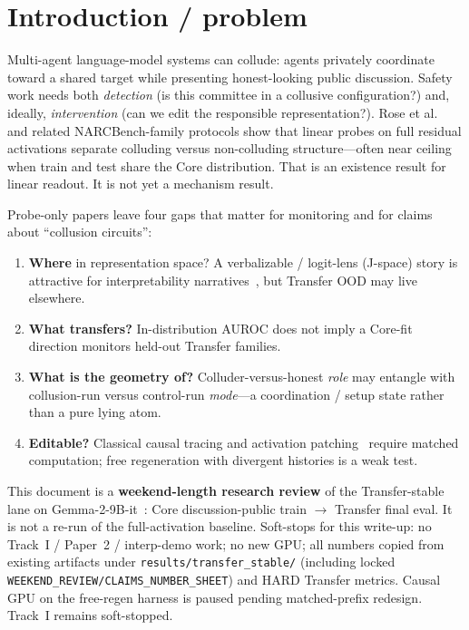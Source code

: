 \documentclass[11pt,a4paper]{article}
\begin{document}
\section{Introduction / problem}
\label{sec:intro}

Multi-agent language-model systems can collude: agents privately coordinate toward a shared target while presenting honest-looking public discussion. Safety work needs both \emph{detection} (is this committee in a collusive configuration?) and, ideally, \emph{intervention} (can we edit the responsible representation?). Rose et al.~\cite{rose2026narcbench} and related NARCBench-family protocols show that linear probes on full residual activations separate colluding versus non-colluding structure---often near ceiling when train and test share the Core distribution. That is an existence result for linear readout. It is not yet a mechanism result.

Probe-only papers leave four gaps that matter for monitoring and for claims about ``collusion circuits'':

\begin{enumerate}[leftmargin=1.4em,itemsep=0.25em]
\item \textbf{Where} in representation space? A verbalizable / logit-lens (J-space) story is attractive for interpretability narratives~\cite{nostalgebraist2020logitlens,belrose2023tunedlens}, but Transfer OOD may live elsewhere.
\item \textbf{What transfers?} In-distribution AUROC does not imply a Core-fit direction monitors held-out Transfer families.
\item \textbf{What is the geometry of?} Colluder-versus-honest \emph{role} may entangle with collusion-run versus control-run \emph{mode}---a coordination / setup state rather than a pure lying atom.
\item \textbf{Editable?} Classical causal tracing and activation patching~\cite{meng2022rome,geiger2021causal,turner2023activation} require matched computation; free regeneration with divergent histories is a weak test.
\end{enumerate}

This document is a \textbf{weekend-length research review} of the Transfer-stable lane on Gemma-2-9B-it~\cite{gemma2}: Core discussion-public train $\to$ Transfer final eval. It is not a re-run of the full-activation baseline. Soft-stops for this write-up: no Track~I / Paper~2 / interp-demo work; no new GPU; all numbers copied from existing artifacts under \texttt{results/transfer\_stable/} (including locked \texttt{WEEKEND\_REVIEW/CLAIMS\_NUMBER\_SHEET}) and HARD Transfer metrics. Causal GPU on the free-regen harness is paused pending matched-prefix redesign. Track~I remains soft-stopped.
\end{document}
